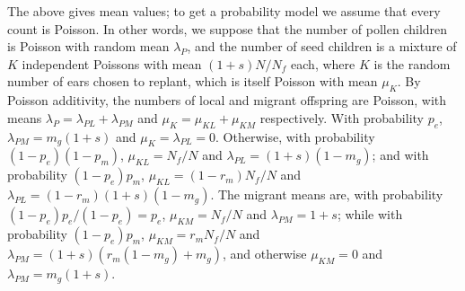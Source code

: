 The above gives mean values; to get a probability model we assume that every count is Poisson.
In other words, we suppose that the number of pollen children is Poisson with random mean $\lambda_P$,
and the number of seed children is a mixture of $K$ independent Poissons with mean $(1+s)N/N_f$ each,
where $K$ is the random number of ears chosen to replant, which is itself Poisson with mean $\mu_K$.
By Poisson additivity, the numbers of local and migrant offspring are Poisson,
with means $\lambda_P = \lambda_{PL} + \lambda_{PM}$ and $\mu_K = \mu_{KL} + \mu_{KM}$ respectively.
With probability $p_e$, $\lambda_{PM} = m_g(1+s)$ and $\mu_K = \lambda_{PL} = 0$.
Otherwise, with probability $(1-p_e)(1-p_m)$, $\mu_{KL} = N_f/N$ and $\lambda_{PL} = (1+s)(1-m_g)$;
and with probability $(1-p_e)p_m$, $\mu_{KL} = (1-r_m) N_f/N$ and $\lambda_{PL} = (1-r_m)(1+s)(1-m_g)$.
The migrant means are,
with probability $(1-p_e) p_e/(1-p_e) = p_e$, $\mu_{KM} = N_f/N$ and $\lambda_{PM} = 1+s$;
while with probability $(1-p_e) p_m$, $\mu_{KM} = r_m N_f/N$ and $\lambda_{PM} = (1+s)(r_m(1-m_g) + m_g)$,
and otherwise $\mu_{KM} = 0$ and $\lambda_{PM} = m_g(1+s)$.



